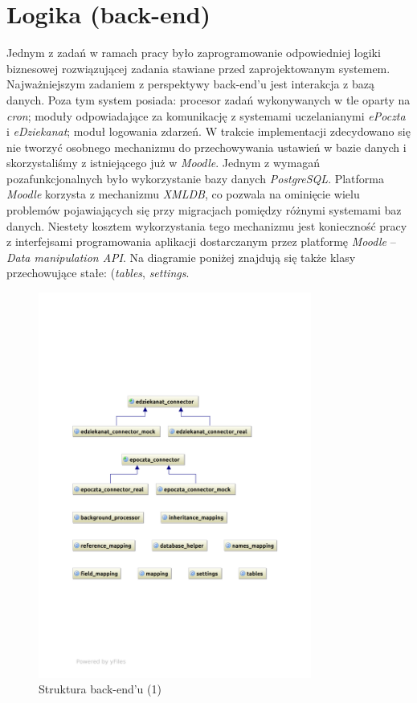 \section{Logika (back-end)}
\label{Chapter66}

Jednym z zadań w ramach pracy było zaprogramowanie odpowiedniej logiki biznesowej rozwiązującej zadania stawiane przed zaprojektowanym systemem. Najważniejszym zadaniem z perspektywy back-end'u jest interakcja z bazą danych. Poza tym system posiada: procesor zadań wykonywanych w tle oparty na \emph{cron}; moduły odpowiadające za komunikację z systemami uczelanianymi \emph{ePoczta} i \emph{eDziekanat}; moduł logowania zdarzeń. W trakcie implementacji zdecydowano się nie tworzyć osobnego mechanizmu do przechowywania ustawień w bazie danych i skorzystaliśmy z istniejącego już w \emph{Moodle}. Jednym z wymagań pozafunkcjonalnych było wykorzystanie bazy danych \emph{PostgreSQL}. Platforma \emph{Moodle} korzysta z mechanizmu \emph{XMLDB}, co pozwala na ominięcie wielu problemów pojawiających się przy migracjach pomiędzy różnymi systemami baz danych. Niestety kosztem wykorzystania tego mechanizmu jest konieczność pracy z interfejsami programowania aplikacji dostarczanym przez platformę \emph{Moodle} -- \emph{Data manipulation API}. Na diagramie poniżej znajdują się także klasy przechowujące stałe: (\emph{tables}, \emph{settings}.\\

\begin{figure}[H]
\begin{center}
\includegraphics[width=0.8\textwidth]{figures/lw/backend1.pdf} 
\end{center}
\caption{Struktura back-end'u (1)}
\label{fig:back-end1}
\end{figure}

